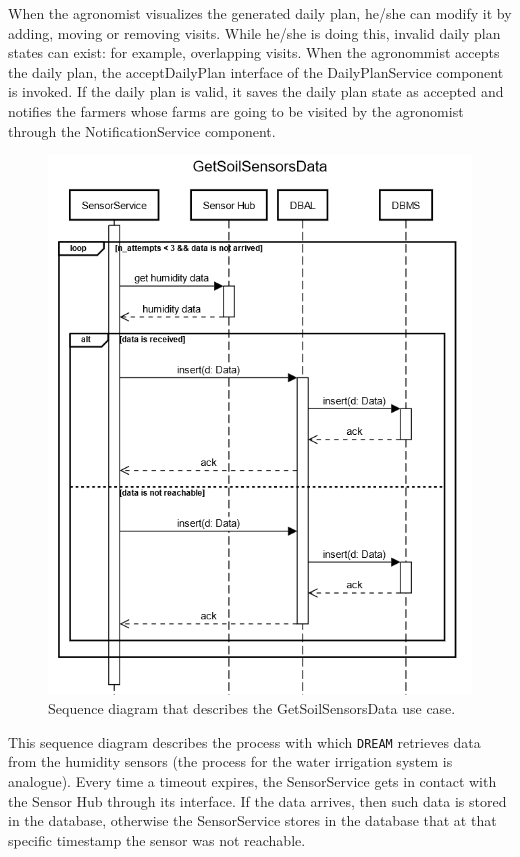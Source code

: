 \documentclass{article}
\begin{document}
When the agronomist visualizes the generated daily plan, he/she can modify it by adding, moving or removing visits. While he/she is doing this, invalid daily plan states can exist: for example, overlapping visits. \newline
When the agronommist accepts the daily plan, the acceptDailyPlan interface of the DailyPlanService component is invoked. If the daily plan is valid, it saves the daily plan state as accepted and notifies the farmers whose farms are going to be visited by the agronomist through the NotificationService component.\\

\newpage
\begin{figure}[H]
   \centering
   \includegraphics[scale=0.60]{diagrams/sequence diagrams/GetSoilSensorsData.png}
    \caption{Sequence diagram that describes the GetSoilSensorsData use case.}
\end{figure}
This sequence diagram describes the process with which \verb|DREAM| retrieves data from the humidity sensors (the process for the water irrigation system is analogue). Every time a timeout expires, the SensorService gets in contact with the Sensor Hub through its interface. If the data arrives, then such data is stored in the database, otherwise the SensorService stores in the database that at that specific timestamp the sensor was not reachable.
\end{document}
